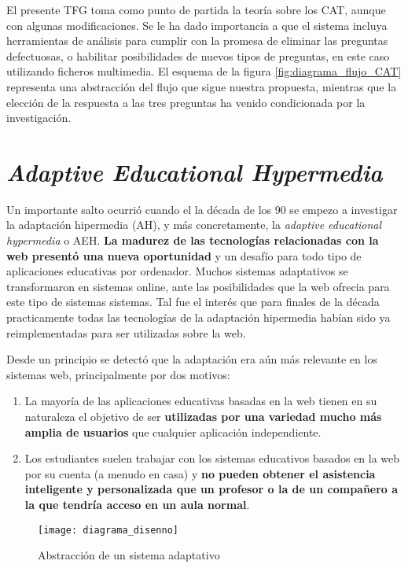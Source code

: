 El presente TFG toma como punto de partida la teoría sobre los \acrshort{CAT}, aunque con algunas modificaciones. Se le ha dado importancia a que el sistema incluya herramientas de análisis para cumplir con la promesa de eliminar las preguntas defectuosas, o habilitar posibilidades de nuevos tipos de preguntas, en este caso utilizando ficheros multimedia. El esquema de la figura \ref{fig:diagrama_flujo_CAT} representa una abstracción del flujo que sigue nuestra propuesta, mientras que la elección de la respuesta a las tres preguntas ha venido condicionada por la investigación.
 
\section{\textit{Adaptive Educational Hypermedia}}

Un importante salto ocurrió cuando el la década de los 90 se empezo a investigar la adaptación hipermedia (\acrshort{AH}), y más concretamente, la \textit{adaptive educational hypermedia} o \acrshort{AEH}. \textbf{La madurez de las tecnologías relacionadas con la web presentó una nueva oportunidad} y un desafío para todo tipo de aplicaciones educativas por ordenador. Muchos sistemas adaptativos se transformaron en sistemas online, ante las posibilidades que la web ofrecia para este tipo de sistemas sistemas\cite{Brusilovsky95}\cite{Nakabayashi97}. Tal fue el interés que para finales de la década practicamente todas las tecnologías de la adaptación hipermedia habían sido ya reimplementadas para ser utilizadas sobre la web\cite{Brusilovsky99}.

Desde un principio se detectó que la adaptación era aún más relevante en los sistemas web, principalmente por dos motivos\cite{Weber01}:

\begin{enumerate}
	\item La mayoría de las aplicaciones educativas basadas en la web tienen en su naturaleza el objetivo de ser \textbf{utilizadas por una variedad mucho más amplia de usuarios} que cualquier aplicación independiente.
	\item Los estudiantes suelen trabajar con los sistemas educativos basados en la web por su cuenta (a menudo en casa) y \textbf{no pueden obtener el asistencia inteligente y personalizada que un profesor o la de un  compañero a la que tendría acceso en un aula normal}.
\end{enumerate}

\begin{figure}[htp!]
	\centering
	\texttt{[image: diagrama\_disenno]}
	\caption{Abstracción de un sistema adaptativo}
	\label{fig:diagrama_disenno}
\end{figure}

